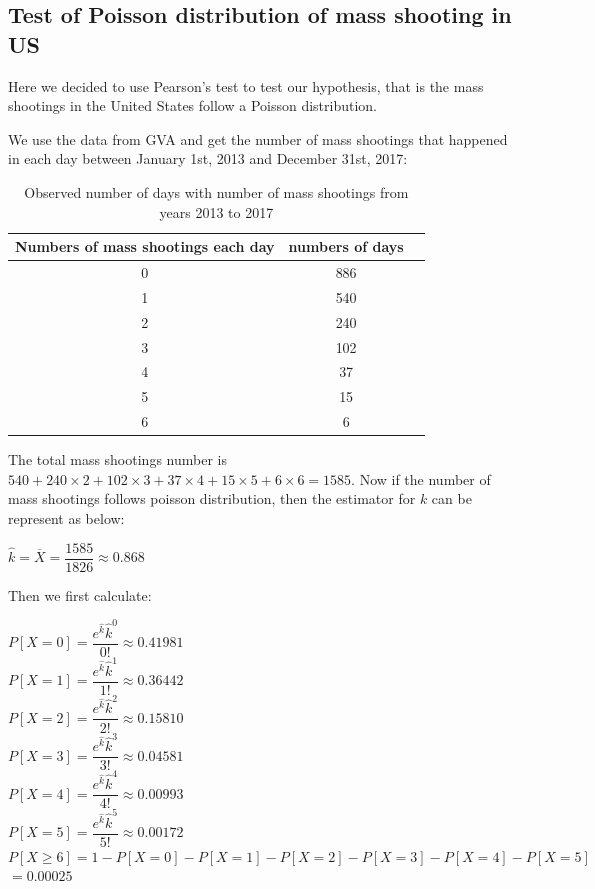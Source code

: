 \documentclass[12pt]{article}
\begin{document}
\subsection{Test of Poisson distribution of mass shooting in US}
Here we decided to use Pearson's test to test our hypothesis, that is the mass shootings in the United States follow a Poisson distribution.
\par We use the data from GVA and get the number of mass shootings that happened in each day between January 1st, 2013 and December 31st, 2017:
\begin{table} [!htbp]
\begin{center}
\begin{tabular*} {14cm} {@{\extracolsep{\fill} }ccc}
\toprule
Numbers of mass shootings each day & numbers of days \\
\midrule
0 & 886 \\ \hline
1 & 540 \\ \hline
2 & 240 \\ \hline
3 & 102 \\ \hline
4 & 37  \\ \hline
5 & 15  \\ \hline
6 & 6   \\
\bottomrule
\end{tabular*}
\end{center}
\caption{Observed number of days with number of mass shootings from years 2013 to 2017}
\end{table}
\par The total mass shootings number is $540+240\times2+102\times3+37\times4+15\times5+6\times6=1585$. Now if the number of mass shootings follows poisson distribution, then the estimator for $k$ can be represent as below:
\begin{center}
$\hat k=\overline X=\dfrac{1585}{1826} \approx0.868$
\end{center}
\par Then we first calculate:
\begin{center}
$P[X=0]=\dfrac{e^{\hat k}\hat k^0}{0!} \approx0.41981$\\
$P[X=1]=\dfrac{e^{\hat k}\hat k^1}{1!} \approx0.36442$\\
$P[X=2]=\dfrac{e^{\hat k}\hat k^2}{2!} \approx0.15810$\\
$P[X=3]=\dfrac{e^{\hat k}\hat k^3}{3!} \approx0.04581$\\
$P[X=4]=\dfrac{e^{\hat k}\hat k^4}{4!} \approx0.00993$\\
$P[X=5]=\dfrac{e^{\hat k}\hat k^5}{5!} \approx0.00172$\\
$P[X\geq6]=1-P[X=0]-P[X=1]-P[X=2]-P[X=3]-P[X=4]-P[X=5]$\\
$=0.00025$
\end{center}
\end{document}
